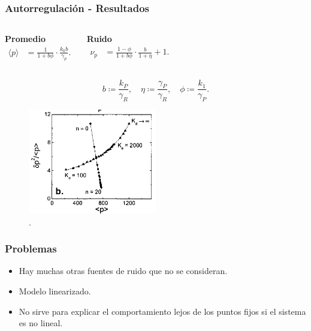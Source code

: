 \documentclass[10pt]{beamer}
\begin{document}
\begin{frame}
\frametitle{Autorregulaci\'on - Resultados}
\begin{columns}[c]

\centering \textbf{Promedio}
\begin{align*}
\langle p \rangle &= \frac{1}{1+b\phi} \cdot \frac{k_0b}{\gamma_p}.
\end{align*}

\centering \textbf{Ruido}
\begin{align*}
\nu_p &= \frac{1-\phi}{1+b\phi} \cdot \frac{b}{1+\eta}+1.
\end{align*}
\end{columns}

\vspace{3 mm}

\begin{equation*}
  b \coloneqq \frac{k_P}{\gamma_R}, \quad \eta \coloneqq \frac{\gamma_P}{\gamma_R}, \quad \phi \coloneqq \frac{k_1}{\gamma_P}.
\end{equation*}

\begin{figure}[p]
    \centering
    \includegraphics[width=0.5\textwidth]{graph5.png}\\
    \tiny \cite{thattai01}.
\end{figure}

\end{frame}

\begin{frame}
\frametitle{Problemas}
\begin{itemize}
\item Hay muchas otras fuentes de ruido que no se consideran.
\item Modelo linearizado.
\item No sirve para explicar el comportamiento lejos de los puntos fijos si el sistema es no lineal.
\end{itemize}
\end{frame}
\end{document}
